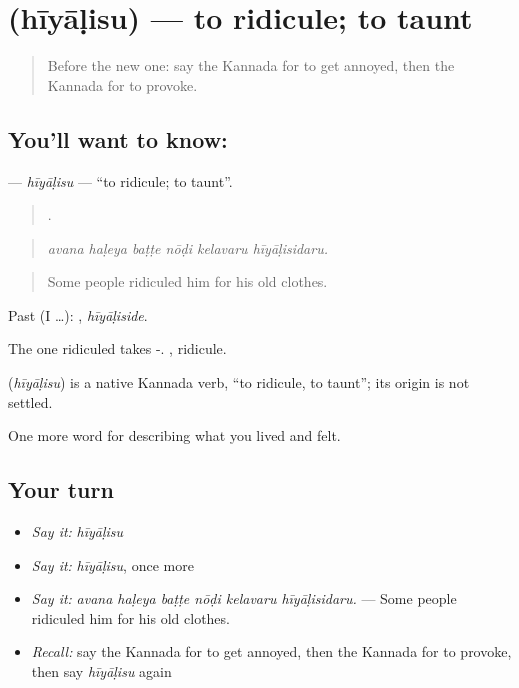 \section[\texorpdfstring{\kn{ಹೀಯಾಳಿಸು} (hīyāḷisu)}{ಹೀಯಾಳಿಸು (hīyāḷisu)}]{ (hīyāḷisu) — to ridicule; to taunt}

\label{lesson:KA-C493-hiyalisu}



\begin{quote}
Before the new one: say the Kannada for to get annoyed, then the Kannada for to provoke.
\end{quote}

\subsection*{You'll want to know: }
\textbf{} — \emph{hīyāḷisu} — \textquotedblleft{}to ridicule; to taunt\textquotedblright{}.

\begin{quote}
     .
\end{quote}

\begin{quote}
\emph{avana haḷeya baṭṭe nōḍi kelavaru hīyāḷisidaru.}
\end{quote}

\begin{quote}
Some people ridiculed him for his old clothes.
\end{quote}

Past (I …): , \emph{hīyāḷiside}.

The one ridiculed takes -. , ridicule.

\begin{cousinweb}
\textbf{} (\emph{hīyāḷisu}) is a native Kannada verb, \textquotedblleft{}to ridicule, to taunt\textquotedblright{}; its origin is not settled.
\end{cousinweb}

\begin{grammarlens}[title={What you've built}]
One more word for describing what you lived and felt.
\end{grammarlens}

\subsection*{Your turn}
\begin{itemize}
\raggedright
  \item \emph{Say it:} \emph{hīyāḷisu}
  \item \emph{Say it:} \emph{hīyāḷisu}, once more
  \item \emph{Say it:} \emph{avana haḷeya baṭṭe nōḍi kelavaru hīyāḷisidaru.} — Some people ridiculed him for his old clothes.
  \item \emph{Recall:} say the Kannada for to get annoyed, then the Kannada for to provoke, then say \emph{hīyāḷisu} again
\end{itemize}

